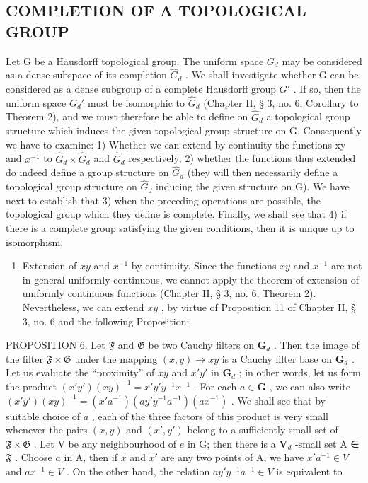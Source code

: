 \subsection{COMPLETION OF A TOPOLOGICAL GROUP}

Let G be a Hausdorff topological group. The uniform space \(G_{d}\) may be considered as a dense subspace of its completion \(\hat{G}_{d}\) . We shall investigate whether G can be considered as a dense subgroup of a complete Hausdorff group \(G'\) . If so, then the uniform space \(G_{d}'\) must be isomorphic to \(\hat{G}_{d}\) (Chapter II, § 3, no. 6, Corollary to Theorem 2), and we must therefore be able to define on \(\hat{G}_{d}\) a topological group structure which induces the given topological group structure on G. Consequently we have to examine: 1) Whether we can extend by continuity the functions xy and \(x^{-1}\) to \(\hat{G}_{d} \times \hat{G}_{d}\) and \(\hat{G}_{d}\) respectively; 2) whether the functions thus extended do indeed define a group structure on \(\hat{G}_{d}\) (they will then necessarily define a topological group structure on \(\hat{G}_{d}\) inducing the given structure on G). We have next to establish that 3) when the preceding operations are possible, the topological group which they define is complete. Finally, we shall see that 4) if there is a complete group satisfying the given conditions, then it is unique up to isomorphism.

\begin{enumerate}
\def\labelenumi{\arabic{enumi})}
\tightlist
\item
  Extension of \(xy\) and \(x^{-1}\) by continuity. Since the functions \(xy\) and \(x^{-1}\) are not in general uniformly continuous, we cannot apply the theorem of extension of uniformly continuous functions (Chapter II, § 3, no. 6, Theorem 2). Nevertheless, we can extend \(xy\) , by virtue of Proposition 11 of Chapter II, § 3, no. 6 and the following Proposition:
\end{enumerate}

PROPOSITION 6. Let \(\mathfrak{F}\) and \(\mathfrak{G}\) be two Cauchy filters on \(\mathbf{G}_d\) . Then the image of the filter \(\mathfrak{F} \times \mathfrak{G}\) under the mapping \((x, y) \to xy\) is a Cauchy filter base on \(\mathbf{G}_d\) . Let us evaluate the ``proximity'' of \(xy\) and \(x'y'\) in \(\mathbf{G}_d\) ; in other words, let us form the product \((x'y')(xy)^{-1} = x'y'y^{-1}x^{-1}\) . For each \(a \in \mathbf{G}\) , we can also write \((x'y')(xy)^{-1} = (x'a^{-1})(ay'y^{-1}a^{-1})(ax^{-1})\) . We shall see that by suitable choice of \(a\) , each of the three factors of this product is very small whenever the pairs \((x, y)\) and \((x', y')\) belong to a sufficiently small set of \(\mathfrak{F} \times \mathfrak{G}\) . Let V be any neighbourhood of \(e\) in G; then there is a \(\mathbf{V}_d\) -small set A ∈ \(\mathfrak{F}\) . Choose \(a\) in A, then if \(x\) and \(x'\) are any two points of A, we have \(x'a^{-1} \in V\) and \(ax^{-1} \in V\) . On the other hand, the relation \(ay'y^{-1}a^{-1} \in V\) is equivalent to

